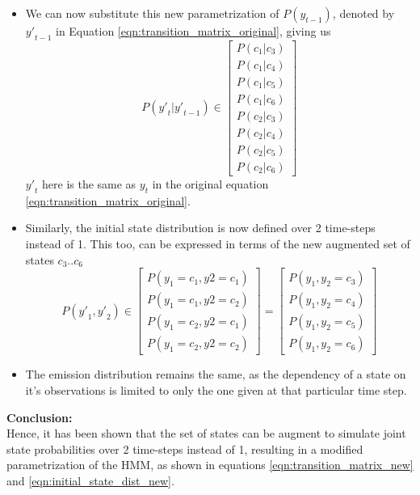 \documentclass[parskip=half]{scrartcl}
\begin{document}
\begin{itemize}
            \item 
            We can now substitute this new parametrization of $P(y_{t-1})$, denoted by ${y\prime}_{t-1}$ in Equation \ref{eqn:transition_matrix_original}, giving us
            \begin{equation} \label{eqn:transition_matrix_new}
                P({y\prime}_t|{y\prime}_{t-1}) \in \begin{bmatrix} P(c_1|c_3) \\ P(c_1|c_4) \\ P(c_1|c_5) \\ P(c_1|c_6) \\ P(c_2|c_3) \\ P(c_2|c_4) \\ P(c_2|c_5) \\ P(c_2|c_6) \end{bmatrix}
            \end{equation}
            ${y\prime}_t$ here is the same as $y_t$ in the original equation \ref{eqn:transition_matrix_original}.
            \item 
            Similarly, the initial state distribution is now defined over 2 time-steps instead of 1. This too, can be expressed in terms of the new augmented set of states $c_3 .. c_6$
            \begin{equation} \label{eqn:initial_state_dist_new}
                P({y\prime}_1, {y\prime}_2) \in \begin{bmatrix} P(y_1 = c_1, y2 = c_1) \\ P(y_1 = c_1, y2 = c_2) \\ P(y_1 = c_2, y2 = c_1) \\ P(y_1 = c_2, y2 = c_2) \end{bmatrix} = \begin{bmatrix} P(y_1,y_2 = c_3) \\ P(y_1,y_2 = c_4) \\ P(y_1,y_2 = c_5) \\ P(y_1,y_2 = c_6) \end{bmatrix}
            \end{equation}
            \item 
            The emission distribution remains the same, as the dependency of a state on it's observations is limited to only the one given at that particular time step.
        \end{itemize}

        \textbf{Conclusion:}\\
        Hence, it has been shown that the set of states can be augment to simulate joint state probabilities over 2 time-steps instead of 1, resulting in a modified parametrization of the HMM, as shown in equations \ref{eqn:transition_matrix_new} and \ref{eqn:initial_state_dist_new}.
    
\end{document}
